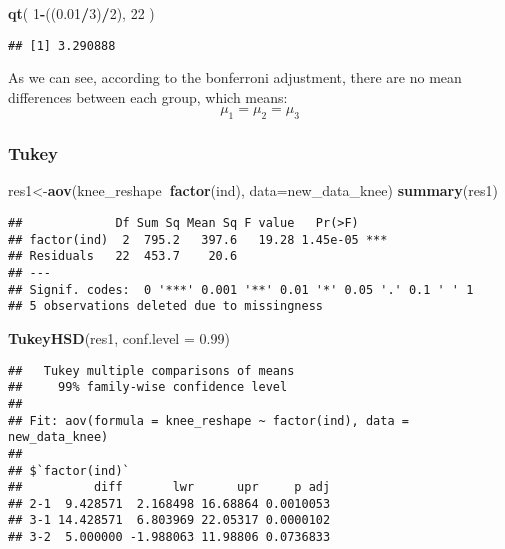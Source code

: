 \documentclass[]{article}
\newenvironment{Shaded}{\begin{snugshade}}{\end{snugshade}}
\newcommand{\KeywordTok}[1]{\textcolor[rgb]{0.13,0.29,0.53}{\textbf{#1}}}
\newcommand{\DataTypeTok}[1]{\textcolor[rgb]{0.13,0.29,0.53}{#1}}
\newcommand{\DecValTok}[1]{\textcolor[rgb]{0.00,0.00,0.81}{#1}}
\newcommand{\FloatTok}[1]{\textcolor[rgb]{0.00,0.00,0.81}{#1}}
\newcommand{\OperatorTok}[1]{\textcolor[rgb]{0.81,0.36,0.00}{\textbf{#1}}}
\newcommand{\NormalTok}[1]{#1}
\begin{document}
\begin{Shaded}
\begin{Highlighting}[]
\KeywordTok{qt}\NormalTok{( }\DecValTok{1}\OperatorTok{-}\NormalTok{((}\FloatTok{0.01}\OperatorTok{/}\DecValTok{3}\NormalTok{)}\OperatorTok{/}\DecValTok{2}\NormalTok{), }\DecValTok{22}\NormalTok{ )}
\end{Highlighting}
\end{Shaded}

\begin{verbatim}
## [1] 3.290888
\end{verbatim}

As we can see, according to the bonferroni adjustment, there are no mean
differences between each group, which means: \[
\mu_{1}=\mu_{2}=\mu_{3}
\]

\subsubsection{Tukey}\label{tukey}

\begin{Shaded}
\begin{Highlighting}[]
\NormalTok{res1<-}\KeywordTok{aov}\NormalTok{(knee_reshape}\OperatorTok{~}\KeywordTok{factor}\NormalTok{(ind), }\DataTypeTok{data=}\NormalTok{new_data_knee)}
\KeywordTok{summary}\NormalTok{(res1)}
\end{Highlighting}
\end{Shaded}

\begin{verbatim}
##             Df Sum Sq Mean Sq F value   Pr(>F)    
## factor(ind)  2  795.2   397.6   19.28 1.45e-05 ***
## Residuals   22  453.7    20.6                     
## ---
## Signif. codes:  0 '***' 0.001 '**' 0.01 '*' 0.05 '.' 0.1 ' ' 1
## 5 observations deleted due to missingness
\end{verbatim}

\begin{Shaded}
\begin{Highlighting}[]
\KeywordTok{TukeyHSD}\NormalTok{(res1, }\DataTypeTok{conf.level =} \FloatTok{0.99}\NormalTok{)}
\end{Highlighting}
\end{Shaded}

\begin{verbatim}
##   Tukey multiple comparisons of means
##     99% family-wise confidence level
## 
## Fit: aov(formula = knee_reshape ~ factor(ind), data = new_data_knee)
## 
## $`factor(ind)`
##          diff       lwr      upr     p adj
## 2-1  9.428571  2.168498 16.68864 0.0010053
## 3-1 14.428571  6.803969 22.05317 0.0000102
## 3-2  5.000000 -1.988063 11.98806 0.0736833
\end{verbatim}
\end{document}
